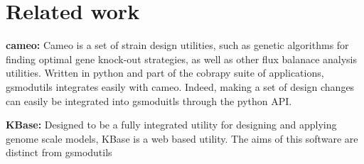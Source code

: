 \documentclass{bioinfo}
\begin{document}
% 
% 
% 
% 
% 
% 

\section{Related work}

\textbf{cameo:} Cameo \cite{} is a set of strain design utilities, such as genetic algorithms for finding optimal gene knock-out
strategies, as well as other flux balanace analysis utilities. Written in python and part of the cobrapy suite of applications,
gsmodutils integrates easily with cameo.
Indeed, making a set of design changes can easily be integrated into gsmoduitls through the python API.

\textbf{KBase:} Designed to be a fully integrated utility for designing and applying genome scale models, KBase is
a web based utility.
The aims of this software are distinct from gsmodutils
\end{document}
